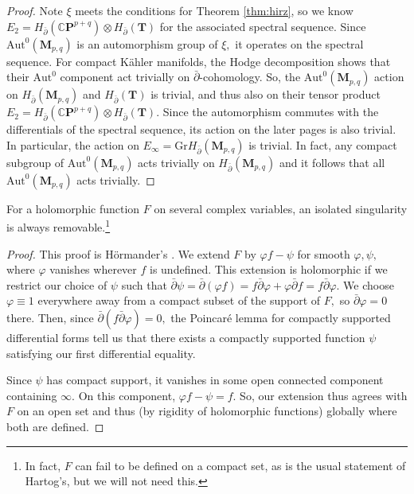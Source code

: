 \begin{proof}
    Note $\xi$ meets the conditions for Theorem \ref{thm:hirz}, so we know $E_2 = H_{\bar\partial}(\mathbb{C}\mathbf{P}^{p+ q}) \otimes H_{\bar\partial}(\mathbf{T})$ for the associated spectral sequence. Since $\mathrm{Aut}^0(\mathbf{M}_{p,q})$ is an automorphism group of $\xi,$ it operates on the spectral sequence. For compact K\"ahler manifolds, the Hodge decomposition shows that their $\mathrm{Aut}^0$ component act trivially on $\bar\partial$-cohomology. So, the $\mathrm{Aut}^0(\mathbf{M}_{p,q})$ action on $H_{\bar\partial}(\mathbf{M}_{p,q})$ and $H_{\bar\partial}(\mathbf{T})$ is trivial, and thus also on their tensor product $E_2 = H_{\bar\partial}(\mathbb{C}\mathbf{P}^{p+q}) \otimes H_{\bar\partial}(\mathbf{T}).$ Since the automorphism commutes with the differentials of the spectral sequence, its action on the later pages is also trivial. In particular, the action on $E_\infty = \mathrm{Gr}H_{\bar \partial}(\mathbf{M}_{p,q})$ is trivial. In fact, any compact subgroup of $\mathrm{Aut}^0(\mathbf{M}_{p,q})$ acts trivially on $H_{\bar \partial}(\mathbf{M}_{p,q})$ and it follows that all $\mathrm{Aut}^0(\mathbf{M}_{p,q})$ acts trivially.
\end{proof}

\begin{lemma}
    For a holomorphic function $F$ on several complex variables, an isolated singularity is always removable.\footnote{In fact, $F$ can fail to be defined on a compact set, as is the usual statement of Hartog's, but we will not need this.}
\end{lemma}
\begin{proof}
    This proof is H\"ormander's \cite{hormander1973}. We extend $F$ by $\varphi f - \psi$ for smooth $\varphi, \psi,$ where $\varphi$ vanishes wherever $f$ is undefined. This extension is holomorphic if we restrict our choice of $\psi$ such that $\bar \partial \psi = \bar \partial( \varphi f )=  f\bar \partial \varphi  + \varphi\bar \partial f = f \bar\partial \varphi.$ We choose $\varphi \equiv 1$ everywhere away from a compact subset of the support of $F,$ so $\bar\partial \varphi = 0$ there. Then, since $\bar\partial (f\bar \partial \varphi) = 0,$ the Poincar\'e lemma for compactly supported differential forms tell us that there exists a compactly supported function $\psi$ satisfying our first differential equality.
    
    Since $\psi$ has compact support, it vanishes in some open connected component containing $\infty.$ On this component, $\varphi f - \psi =  f.$ So, our extension thus agrees with $F$ on an open set and thus (by rigidity of holomorphic functions) globally where both are defined.
\end{proof}

